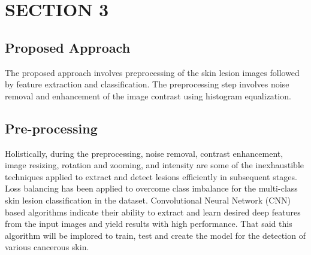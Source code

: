 \documentclass{article}
\begin{document}
\section{SECTION 3}

\subsection{Proposed Approach}
The proposed approach involves preprocessing of the skin lesion images followed by feature extraction and classification. The preprocessing step involves noise removal and enhancement of the image contrast using histogram equalization.

\subsection{Pre-processing}
Holistically, during the preprocessing, noise removal, contrast enhancement, image resizing, rotation and zooming, and intensity are some of the inexhaustible techniques applied to extract and detect lesions efficiently in subsequent stages.  Loss balancing has been applied to overcome class imbalance for the multi-class skin lesion classification in the dataset. Convolutional Neural Network (CNN) based algorithms indicate their ability to extract and learn desired deep features from the input images and yield results with high performance. That said this algorithm will be implored to train, test and create the model for the detection of various cancerous skin.
\end{document}
